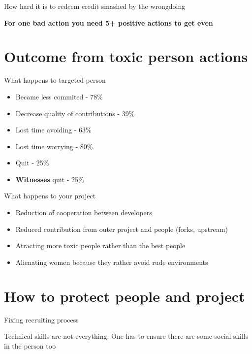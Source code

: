 \documentclass{beamer}
\begin{document}
\begin{frame}{How hard it is to redeem credit smashed by the wrongdoing}
	\begin{center}
	\textbf{For one bad action you need 5+ positive actions to get even}
	\end{center}
\end{frame}

\section{Outcome from toxic person actions}

\begin{frame}[t]{What happens to targeted person}
	\begin{itemize}
	\item Became less commited - 78\%
	\item Decrease quality of contributions - 39\%
	\item Lost time avoiding - 63\%
	\item Lost time worrying - 80\%
	\item Quit - 25\%
	\item \textbf{Witnesses} quit - 25\%
	\end{itemize}
\end{frame}

\begin{frame}[t]{What happens to your project}
	\begin{itemize}
	\item Reduction of cooperation between developers
	\item Reduced contribution from outer project and people (forks, upstream)
	\item Atracting more toxic people rather than the best people
	\item Alienating women because they rather avoid rude environments
	\end{itemize}
\end{frame}

\section{How to protect people and project}

\begin{frame}{Fixing recruiting process}
	\begin{center}
	Technical skills are not everything. One has to ensure there are some social skills in the person too
	\end{center}
\end{frame}
\end{document}

